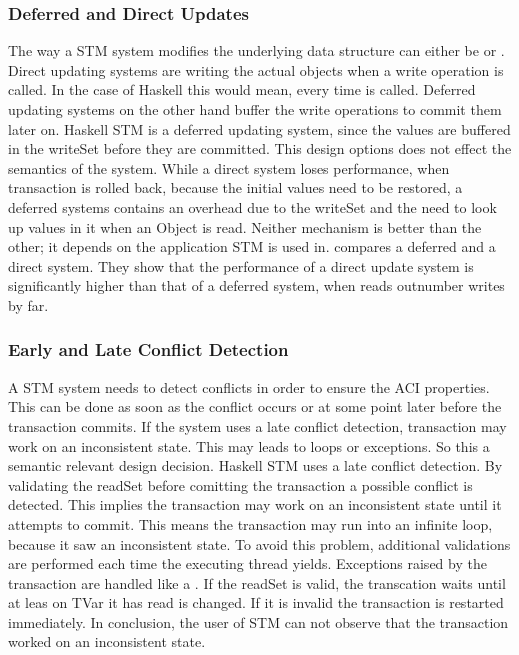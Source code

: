 \subsubsection{Deferred and Direct Updates} The way a STM system modifies the underlying data structure can either be 
or . Direct updating systems are writing the actual objects when a write operation is called. In the case of Haskell 
this would mean, every time  is called. Deferred updating systems on the other hand buffer the write operations to
commit them later on. Haskell STM is a deferred updating system, since the values are buffered in the writeSet before they are
committed. This design options does not effect the semantics of the system. While a direct system loses performance, when transaction
is rolled back, because the initial values need to be restored, a deferred systems contains an overhead due to the writeSet and the 
need to look up values in it when an Object is read. Neither mechanism is better than the other; it depends on the application STM 
is used in. \parencite{pessimisticSTM} compares a deferred and a direct system. They show that the performance of a direct update 
system is significantly higher than that of a deferred system, when reads outnumber writes by far.

\subsubsection{Early and Late Conflict Detection} A STM system needs to detect conflicts in order to ensure the ACI properties. This can 
be done as soon as the conflict occurs or at some point later before the transaction commits. If the system uses a late conflict 
detection, transaction may work on an inconsistent state. This may leads to loops or exceptions. So this a semantic relevant design 
decision. Haskell STM uses a late conflict detection. By validating the readSet before comitting the transaction a possible conflict
is detected. This implies the transaction may work on an inconsistent state until it attempts to commit. This means the transaction 
may run into an infinite loop, because it saw an inconsistent state. To avoid this problem, additional validations are performed
each time the executing thread yields. Exceptions raised by the transaction are handled like a . If the readSet is valid,
the transcation waits until at leas on TVar it has read is changed. If it is invalid the transaction is restarted immediately.
In conclusion, the user of STM can not observe that the transaction worked on an inconsistent state.

